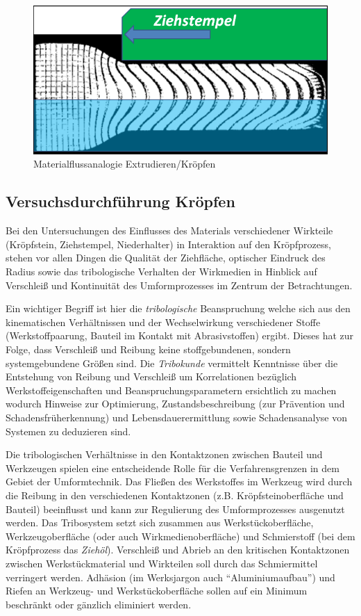 \documentclass[12pt,a4paper,parskip,twoside,BCOR5mm,headsepline]{scrartcl}
\begin{document}
\begin{description*}
\begin{figure}[hbtp]
\centering
\includegraphics[width=.8\textwidth]{materialflussvergleich}
\caption{Materialflussanalogie Extrudieren/Kröpfen\autocite[13.9]{kl}}
\label{fig:git}
\end{figure}



\subsection{Versuchsdurchführung Kröpfen}
Bei den Untersuchungen des Einflusses des Materials verschiedener Wirkteile (Kröpfstein, Ziehstempel, Niederhalter) in Interaktion  auf den Kröpfprozess, stehen vor allen Dingen die Qualität der Ziehfläche, optischer Eindruck des Radius  sowie das tribologische Verhalten der Wirkmedien in Hinblick auf Verschleiß und Kontinuität des Umformprozesses im Zentrum der Betrachtungen.

Ein wichtiger Begriff ist hier die \emph{tribologische} Beanspruchung welche sich aus den kinematischen Verhältnissen und der Wechselwirkung verschiedener Stoffe (Werkstoffpaarung, Bauteil im Kontakt mit Abrasivstoffen) ergibt. Dieses hat zur Folge, dass Verschleiß und Reibung keine stoffgebundenen, sondern systemgebundene Größen sind. Die \emph{Tribokunde} vermittelt Kenntnisse über die Entstehung von Reibung und Verschleiß um Korrelationen bezüglich Werkstoffeigenschaften und Beanspruchungsparametern ersichtlich zu machen wodurch Hinweise zur Optimierung, Zustandsbeschreibung (zur Prävention und Schadensfrüherkennung) und Lebensdauerermittlung sowie Schadensanalyse von Systemen zu deduzieren sind.\autocite[388-390]{wki}

Die tribologischen Verhältnisse in den Kontaktzonen zwischen Bauteil und Werkzeugen spielen eine entscheidende Rolle für die Verfahrensgrenzen in dem Gebiet der Umformtechnik. Das Fließen des Werkstoffes im Werkzeug wird durch die Reibung in den verschiedenen Kontaktzonen (z.B. Kröpfsteinoberfläche und Bauteil) beeinflusst und kann zur Regulierung des Umformprozesses ausgenutzt werden. Das Tribosystem setzt sich zusammen aus Werkstückoberfläche, Werkzeugoberfläche (oder auch Wirkmedienoberfläche) und Schmierstoff (bei dem Kröpfprozess das \emph{Ziehöl}). Verschleiß und Abrieb  an den kritischen Kontaktzonen zwischen Werkstückmaterial und Wirkteilen soll durch das Schmiermittel verringert werden. Adhäsion (im Werksjargon auch "`Aluminiumaufbau"') und Riefen  an Werkzeug- und Werkstückoberfläche sollen auf ein Minimum beschränkt oder gänzlich eliminiert werden.\autocite[516]{aa}


\end{description*}
\end{document}
